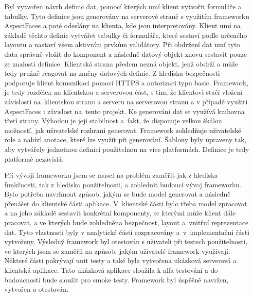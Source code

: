 Byl vytvořen návrh definic dat, pomocí kterých umí klient vytvořit formuláře a tabulky. Tyto definice jsou generovány na serverové straně s využitím frameworku AspectFaces a poté odeslány na klienta, kde jsou interpretovány. Klient umí na základě těchto definic vytvářet tabulky či formuláře, které sestaví podle určeného layoutu a nastaví všem aktivním prvkům validátory. Při obdržení dat umí tyto data správně vložit do komponent a následně datový objekt znovu sestavit pouze ze znalosti definice. Klientská strana předem nezná objekt, jenž obdrží a může tedy pružně reagovat na změny datových definic. Z hlediska bezpečnosti podporuje klient komunikaci pomocí HTTPS a autorizaci typu basic. Framework, je tedy rozdělen na klientskou a serverovou část, s tím, že klientovi stačí vložení závislosti na~klientskou stranu a serveru na serverovou stranu a v případě využití AspectFaces i závislost na~tento projekt. Ke generování dat se využívá knihovna třetí strany. Výhodou je její stabilnost a~fakt, že disponuje velkou škálou možností, jak uživatelské rozhraní generovat. Framework zohledňuje uživatelské role a nabízí anotace, které lze využít při generování. Šablony byly upraveny tak, aby vytvářely jednotnou definici použitelnou na více platformách. Definice je tedy platformě nezávislá. 

Při vývoji frameworku jsem se musel na problém zaměřit jak z hlediska funkčnosti, tak z hlediska použitelnosti, a zohlednit budoucí vývoj frameworku. Bylo potřeba navrhnout způsob, jakým se bude model generovat a následně přenášet do klientské části aplikace. V~klientské části bylo třeba model zpracovat a na jeho základě sestavit konkrétní komponenty, se kterými může klient dále pracovat, a ve kterých bude zohledněna bezpečnost, layout a~vnitřní reprezentace dat. Tyto vlastnosti byly v analytické části rozpracovány a~v~implementační části vytvořeny. Výsledný framework byl otestován s uživateli při testech použitelnosti, ve kterých jsem se zaměřil na způsob, jakým uživatelé framework využívají. Některé části pokrývají unit testy a také byla vytvořena ukázková serverová a klientská aplikace. Tato ukázková aplikace sloužila k alfa testování a do budoucnosti bude sloužit pro smoke testy. Framework byl úspěšně navržen, vytvořen a otestován.
